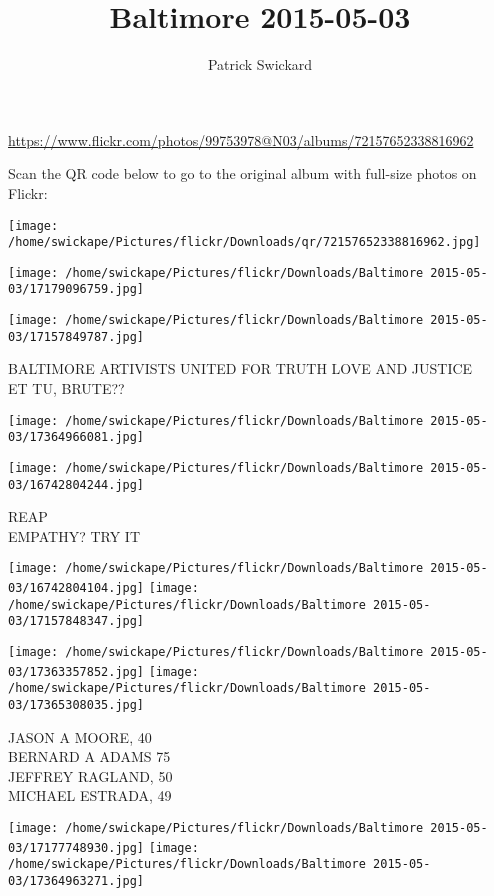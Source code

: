 \documentclass[10pt,letterpaper]{article}
\title{Baltimore 2015-05-03}
\author{Patrick Swickard}
\date{}
\begin{document}
\maketitle

\url{https://www.flickr.com/photos/99753978@N03/albums/72157652338816962}

Scan the QR code below to go to the original album with full-size photos on Flickr:

\texttt{[image: /home/swickape/Pictures/flickr/Downloads/qr/72157652338816962.jpg]}
\pagebreak

\texttt{[image: /home/swickape/Pictures/flickr/Downloads/Baltimore 2015-05-03/17179096759.jpg]}

\vspace{0.25in}
\texttt{[image: /home/swickape/Pictures/flickr/Downloads/Baltimore 2015-05-03/17157849787.jpg]}

BALTIMORE ARTIVISTS UNITED FOR TRUTH LOVE AND JUSTICE\\
ET TU, BRUTE??
\pagebreak

\texttt{[image: /home/swickape/Pictures/flickr/Downloads/Baltimore 2015-05-03/17364966081.jpg]}

\vspace{0.25in}
\texttt{[image: /home/swickape/Pictures/flickr/Downloads/Baltimore 2015-05-03/16742804244.jpg]}

REAP\\
EMPATHY?  TRY IT
\pagebreak

\texttt{[image: /home/swickape/Pictures/flickr/Downloads/Baltimore 2015-05-03/16742804104.jpg]}
\texttt{[image: /home/swickape/Pictures/flickr/Downloads/Baltimore 2015-05-03/17157848347.jpg]}

\texttt{[image: /home/swickape/Pictures/flickr/Downloads/Baltimore 2015-05-03/17363357852.jpg]}
\texttt{[image: /home/swickape/Pictures/flickr/Downloads/Baltimore 2015-05-03/17365308035.jpg]}

JASON A MOORE, 40\\
BERNARD A ADAMS 75\\
JEFFREY RAGLAND, 50\\
MICHAEL ESTRADA, 49
\pagebreak

\texttt{[image: /home/swickape/Pictures/flickr/Downloads/Baltimore 2015-05-03/17177748930.jpg]}
\texttt{[image: /home/swickape/Pictures/flickr/Downloads/Baltimore 2015-05-03/17364963271.jpg]}
\end{document}
